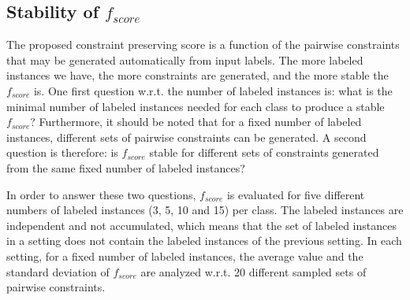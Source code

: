 
\subsection{Stability of $f_{score}$}\label{sec:result:stability}

The proposed constraint preserving score is a function of the pairwise constraints that may be generated automatically from input labels.
The more labeled instances we have, the more constraints are generated, and the more stable the $f_{score}$ is.
One first question w.r.t. the number of labeled instances is: what is the minimal number of labeled instances needed for each class to produce a stable $f_{score}$?
Furthermore, it should be noted that for a fixed number of labeled instances, different sets of pairwise constraints can be generated.
A second question is therefore: is $f_{score}$ stable for different sets of constraints generated from the same fixed number of labeled instances?

In order to answer these two questions, $f_{score}$ is evaluated for five different numbers of labeled instances (3, 5, 10 and 15) per class.
The labeled instances are independent and not accumulated, which means that the set of labeled instances in a setting does not contain the labeled instances of the previous setting.
In each setting, for a fixed number of labeled instances, the average value and the standard deviation of $f_{score}$ are analyzed w.r.t. 20 different sampled sets of pairwise constraints.

